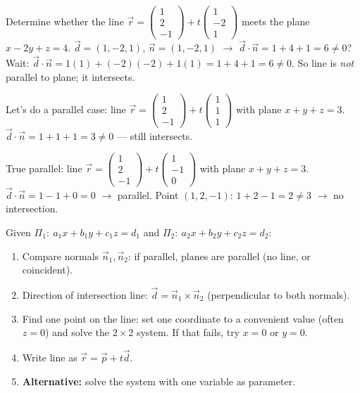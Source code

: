 \documentclass[11pt]{article}
\begin{document}
\begin{exoresolu}
Determine whether the line $\vec{r}=\begin{pmatrix}1\\2\\-1\end{pmatrix}+t\begin{pmatrix}1\\-2\\1\end{pmatrix}$ meets the plane $x-2y+z=4$.
\tcblower
$\vec{d}=(1,-2,1)$, $\vec{n}=(1,-2,1)$ $\rightarrow$ $\vec{d}\cdot\vec{n}=1+4+1=6\neq0$? Wait: $\vec{d}\cdot\vec{n}=1(1)+(-2)(-2)+1(1)=1+4+1=6\neq0$. So line is \emph{not} parallel to plane; it intersects.

Let's do a parallel case: line $\vec{r}=\begin{pmatrix}1\\2\\-1\end{pmatrix}+t\begin{pmatrix}1\\1\\1\end{pmatrix}$ with plane $x+y+z=3$.
$\vec{d}\cdot\vec{n}=1+1+1=3\neq0$ — still intersects.

True parallel: line $\vec{r}=\begin{pmatrix}1\\2\\-1\end{pmatrix}+t\begin{pmatrix}1\\-1\\0\end{pmatrix}$ with plane $x+y+z=3$.
$\vec{d}\cdot\vec{n}=1-1+0=0$ $\rightarrow$ parallel. Point $(1,2,-1)$: $1+2-1=2\neq3$ $\rightarrow$ no intersection.
\end{exoresolu}

\begin{methode}
Given $\Pi_1:\ a_1x+b_1y+c_1z=d_1$ and $\Pi_2:\ a_2x+b_2y+c_2z=d_2$:
\begin{enumerate}
\item Compare normals $\vec{n}_1,\vec{n}_2$: if parallel, planes are parallel (no line, or coincident).
\item Direction of intersection line: $\vec{d}=\vec{n}_1\times\vec{n}_2$ (perpendicular to both normals).
\item Find one point on the line: set one coordinate to a convenient value (often $z=0$) and solve the $2\times2$ system. If that fails, try $x=0$ or $y=0$.
\item Write line as $\vec{r}=\vec{p}+t\vec{d}$.
\item \textbf{Alternative:} solve the system with one variable as parameter.
\end{enumerate}
\end{methode}
\end{document}
